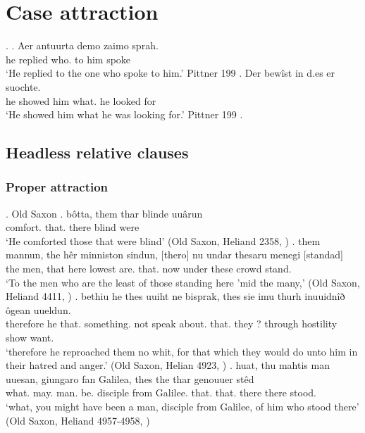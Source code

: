 
\chapter{Case attraction}


\ex.
\ag. Aer antuurta demo zaimo sprah.\\
he replied who. {to him} spoke\\
`He replied to the one who spoke to him.' Pittner 199
\bg. Der bewîst in d.es er suochte.\\
he showed him what. he {looked for}\\
`He showed him what he was looking for.' Pittner 199
\z.


\section{Headless relative clauses}

\subsection{Proper attraction}

\ex. Old Saxon
\ag. bôtta, them thar blinde uuârun\\
 comfort. that. there blind were\\
 `He comforted those that were blind' \hfill (Old Saxon, Heliand 2358, \citealt[761]{behaghel1923})
\bg. them mannun, the hêr minniston sindun, [thero] nu undar thesaru menegi [standad]\\
 the men, that here lowest are. that. now under these crowd stand.\\
 `To the men who are the least of those standing here ’mid the many,' \hfill (Old Saxon, Heliand 4411, \citealt[761]{behaghel1923})
\bg. bethiu he thes uuiht ne bisprak,
thes sie imu thurh inuuidnîð ôgean uueldun.\\
 therefore he that. something. not {speak about}.
 that. they ? through hostility show want.\\
 `therefore he reproached them no whit, for that which they would do unto him in their hatred and anger.' \hfill (Old Saxon, Helian 4923, \citealt[761]{behaghel1923})
\bg. huat, thu mahtis man uuesan, giungaro fan Galilea, thes the thar genouuer stêd\\
 what.  may. man. be. disciple from Galilee. that. that. there there stood. \\
 `what, you might have been a man, disciple from Galilee, of him who stood there' \hfill (Old Saxon, Heliand 4957-4958, \citealt[761]{behaghel1923})

